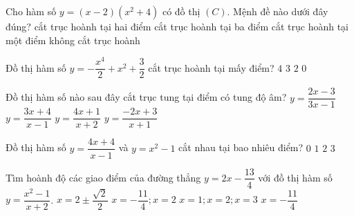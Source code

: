\begin{ex}%
	Cho hàm số $y=(x-2)\left(x^2+4\right)$ có đồ thị $ (C) $. Mệnh đề nào dưới đây đúng?
	\choice
	{cắt trục hoành tại hai điểm}
	{cắt trục hoành tại ba điểm}
	{\True cắt trục hoành tại một điểm}
	{không cắt trục hoành}
\end{ex}
\begin{ex}%
	Đồ thị hàm số $y=-\dfrac{x^4}{2}+x^2+\dfrac{3}{2}$ cắt trục hoành tại mấy điểm?
	\choice
	{$4$}
	{$3$}
	{\True $2$}
	{$0$}
\end{ex}
\begin{ex}%
	Đồ thị hàm số nào sau đây cắt trục tung tại điểm có tung độ âm?
	\choice
	{$y=\dfrac{2x-3}{3x-1}$}
	{\True $y=\dfrac{3x+4}{x-1}$}
	{$y=\dfrac{4x+1}{x+2}$}
	{$y=\dfrac{-2x+3}{x+1}$}
\end{ex}
\begin{ex}%
	Đồ thị hàm số $y=\dfrac{4x+4}{x-1}$ và $y=x^2-1$ cắt nhau tại bao nhiêu điểm?
	\choice
	{$0$}
	{$1$}
	{\True $2$}
	{$3$}
\end{ex}
\begin{ex}%
	Tìm hoành độ các giao điểm của đường thẳng $y=2x-\dfrac{13}{4}$ với đồ thị hàm số $y=\dfrac{x^2-1}{x+2}$. 
	\choice
	{$x=2\pm\dfrac{\sqrt{2}}{2}$}
	{\True $x=-\dfrac{11}{4};x=2$}
	{$x=1;x=2;x=3$}
	{$x=-\dfrac{11}{4}$}
\end{ex}
